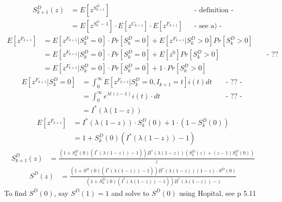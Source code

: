 \begin{align*}
S_{{k+1}}^{D}\left(z\right)&=E\left[z^{{S_{{k+1}}^{D}}}\right]&& \text{-  definition -}\\
&=E\left[z^{{S_{k}^{D}-1}}\right]\cdot E\left[z^{{C_{{k+1}}}}\right]\cdot E\left[z^{{F_{{k+1}}}}\right]&& \text{-  see a) -}
\end{align*}
\begin{align*}
E\left[z^{{F_{{k+1}}}}\right]&=E\left[z^{{F_{{k+1}}}}|S_{k}^{D}=0\right]\cdot Pr\left[S_{k}^{D}=0\right]+E\left[z^{{F_{{k+1}}}}|S_{k}^{D}> 0\right]Pr\left[S_{k}^{D}> 0\right]\\
&=E\left[z^{{F_{{k+1}}}}|S_{k}^{D}=0\right]\cdot Pr\left[S_{k}^{D}=0\right]+E\left[z^0\right]Pr\left[S_{k}^{D}> 0\right] && \text{ - ?? - }\\ 
&=E\left[z^{{F_{{k+1}}}}|S_{k}^{D}=0\right]\cdot Pr\left[S_{k}^{D}=0\right]+1 \cdot Pr\left[S_{k}^{D}> 0\right]
\end{align*}
\begin{align*}
E\left[z^{{F_{{k+1}}}}|S_{k}^{D}=0\right]&=\int _{0}^{\infty }E\left[z^{{F_{{k+1}}}}|S_{k}^{D}=0,I_{{k+1}}=t\right]i\left(t\right)dt  && \text{ - ?? - }\\
&=\int _{0}^{\infty }e^{{\lambda t\left(z-1\right)}}i\left(t\right)\cdot dt  && \text{ - ?? - }\\
&=I^{{\ast }}\left(\lambda \left(1-z\right)\right)
\end{align*}
\begin{align*}
E\left[z^{{F_{{k+1}}}}\right]&=I^{{\ast }}\left(\lambda \left(1-z\right)\right)\cdot S_{k}^{D}\left(0\right)+1\cdot \left(1-S_{k}^{D}\left(0\right)\right)\\
&=1+S_{k}^{D}\left(0\right)\left(I^{{\ast }}\left(\lambda \left(1-z\right)\right)-1\right)
\end{align*}
\begin{align*}
S_{{k+1}}^{D}\left(z\right)&=\frac{\left(1+S_{k}^{D}\left(0\right)\left(I^{{\ast }}\left(\lambda \left(1-z\right)\right)-1\right)\right)B^{{\ast }}\left(\lambda \left(1-z\right)\right)\left(S_{k}^{D}\left(z\right)+\left(z-1\right)S_{k}^{D}\left(0\right)\right)}{z}
\end{align*}
\begin{align*}
S^{D}\left(z\right)&=\frac{\left(1+S^{D}\left(0\right)\left(I^{{\ast }}\left(\lambda \left(1-z\right)\right)-1\right)\right)B^{{\ast }}\left(\lambda \left(1-z\right)\right)\left(1-z\right)\cdot S^{D}\left(0\right)}{\left(1+S_{k}^{D}\left(0\right)\left(I^{{\ast }}\left(\lambda \left(1-z\right)\right)-1\right)\right)B^{{\ast }}\left(\lambda \left(1-z\right)\right)-z}
\end{align*}
To find $S^{D}\left(0\right)$, say $S^{D}\left(1\right)=1$ and solve to $S^{D}\left(0\right)$ using Hopital, see p 5.11

